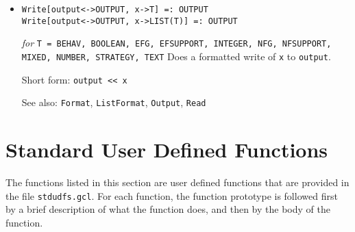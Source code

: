 \begin{itemize}
\item{}
\protect \large \begin{verbatim}
Write[output<->OUTPUT, x->T] =: OUTPUT  
Write[output<->OUTPUT, x->LIST(T)] =: OUTPUT
\end{verbatim}\normalsize

{\it for} {\tt T = BEHAV, BOOLEAN, EFG, EFSUPPORT, INTEGER,
NFG, NFSUPPORT, MIXED, NUMBER, STRATEGY, TEXT}
\bd
Does a formatted write of \verb+x+ to \verb+output+.
\item [Short form:] \verb+output << x+
\item [See also:] \verb+Format+, \verb+ListFormat+, \verb+Output+, \verb+Read+
\ed




\end{itemize}

\section{Standard User Defined Functions}
\renewcommand{\mysectionname}{\thesection\,\, USER DEFINED FUNCTIONS}

The functions listed in this section are user defined functions that
are provided in the file \verb+stdudfs.gcl+.  For each function, the
function prototype is followed first by a brief description of what
the function does, and then by the body of the function.  

